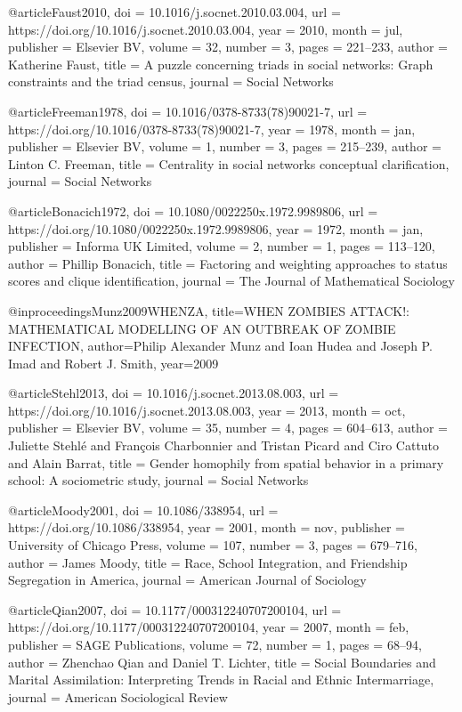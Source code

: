 @article{Faust2010,
  doi = {10.1016/j.socnet.2010.03.004},
  url = {https://doi.org/10.1016/j.socnet.2010.03.004},
  year = {2010},
  month = jul,
  publisher = {Elsevier {BV}},
  volume = {32},
  number = {3},
  pages = {221--233},
  author = {Katherine Faust},
  title = {A puzzle concerning triads in social networks: Graph constraints and the triad census},
  journal = {Social Networks}
}

@article{Freeman1978,
  doi = {10.1016/0378-8733(78)90021-7},
  url = {https://doi.org/10.1016/0378-8733(78)90021-7},
  year = {1978},
  month = jan,
  publisher = {Elsevier {BV}},
  volume = {1},
  number = {3},
  pages = {215--239},
  author = {Linton C. Freeman},
  title = {Centrality in social networks conceptual clarification},
  journal = {Social Networks}
}

@article{Bonacich1972,
  doi = {10.1080/0022250x.1972.9989806},
  url = {https://doi.org/10.1080/0022250x.1972.9989806},
  year = {1972},
  month = jan,
  publisher = {Informa {UK} Limited},
  volume = {2},
  number = {1},
  pages = {113--120},
  author = {Phillip Bonacich},
  title = {Factoring and weighting approaches to status scores and clique identification},
  journal = {The Journal of Mathematical Sociology}
}

@inproceedings{Munz2009WHENZA,
  title={WHEN ZOMBIES ATTACK!: MATHEMATICAL MODELLING OF AN OUTBREAK OF ZOMBIE INFECTION},
  author={Philip Alexander Munz and Ioan Hudea and Joseph P. Imad and Robert J. Smith},
  year={2009}
}

@article{Stehl2013,
  doi = {10.1016/j.socnet.2013.08.003},
  url = {https://doi.org/10.1016/j.socnet.2013.08.003},
  year = {2013},
  month = oct,
  publisher = {Elsevier {BV}},
  volume = {35},
  number = {4},
  pages = {604--613},
  author = {Juliette Stehl{\'{e}} and Fran{\c{c}}ois Charbonnier and Tristan Picard and Ciro Cattuto and Alain Barrat},
  title = {Gender homophily from spatial behavior in a primary school: A sociometric study},
  journal = {Social Networks}
}

@article{Moody2001,
  doi = {10.1086/338954},
  url = {https://doi.org/10.1086/338954},
  year = {2001},
  month = nov,
  publisher = {University of Chicago Press},
  volume = {107},
  number = {3},
  pages = {679--716},
  author = {James Moody},
  title = {Race,  School Integration,  and Friendship Segregation in America},
  journal = {American Journal of Sociology}
}

@article{Qian2007,
  doi = {10.1177/000312240707200104},
  url = {https://doi.org/10.1177/000312240707200104},
  year = {2007},
  month = feb,
  publisher = {{SAGE} Publications},
  volume = {72},
  number = {1},
  pages = {68--94},
  author = {Zhenchao Qian and Daniel T. Lichter},
  title = {Social Boundaries and Marital Assimilation: Interpreting Trends in Racial and Ethnic Intermarriage},
  journal = {American Sociological Review}
}


